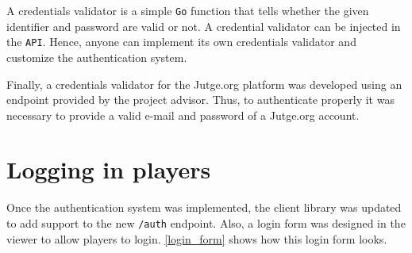 \documentclass[a4paper,11pt,titlepage,abstract,numbers=noenddot,automark,mnsy,intlimits,rgb,dvipsnames]{report}
\begin{document}
A credentials validator is a simple \texttt{Go} function that tells whether the given identifier and
password are valid or not. A credential validator can be injected in the \texttt{API}. Hence, anyone can
implement its own credentials validator and customize the authentication system.

Finally, a credentials validator for the Jutge.org platform was developed using an endpoint provided by the project
advisor. Thus, to authenticate properly it was necessary to provide a valid e-mail and password of a
Jutge.org account.
\section{Logging in players}
Once the authentication system was implemented, the client library was updated to add support to the new \texttt{/auth}
endpoint. Also, a login form was designed in the viewer to allow players to login. \autoref{login_form}
shows how this login form looks.
\end{document}
